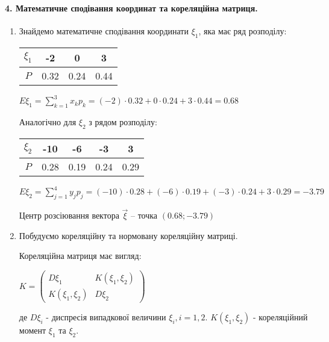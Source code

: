 \documentclass[a4paper, 20pt, titlepage]{article}
\begin{document}
\paragraph{4. Математичне сподівання координат та кореляційна матриця.}
\hfill \break

\begin{spacing}{1.4}
\begin{enumerate}
\item Знайдемо математичне сподівання координати $\xi_1$, яка має ряд розподілу:
\begin{center}
\begin{tabular}{|c|c|c|c|}
\hline
$\xi_1$ & -2 & 0 & 3 \\ \hline
$P$ & 0.32  & 0.24 &  0.44 \\ \hline
\end{tabular}

\vspace{5mm}
$E \xi_1 = \sum_{k = 1}^3 x_k p_k = (-2) \cdot 0.32 + 0 \cdot 0.24 + 3 \cdot 0.44 = 0.68$ 
\end{center}

\vspace{2mm}
Аналогічно для $\xi_2$ з рядом розподілу:

\begin{center}
\begin{tabular}{|c|c|c|c|c|}
\hline
$\xi_2$ & -10 & -6 & -3 & 3\\ \hline
$P$ & 0.28  & 0.19 &  0.24 & 0.29 \\ \hline
\end{tabular}

\vspace{5mm}
$E \xi_2 = \sum_{j = 1}^4 y_j p_j = (-10) \cdot 0.28 + (-6) \cdot 0.19 + (-3) \cdot 0.24 + 3 \cdot 0.29 = -3.79$
\end{center}

\vspace{2mm}

Центр розсіювання вектора $\vec{\xi}$ -- точка $(0.68 ; -3.79)$


\newpage{}

\item Побудуємо кореляційну та нормовану кореляційну матриці.

Кореляційна матриця має вигляд:
\begin{center}
$
K = 
\begin{pmatrix}
D \xi_1 & K(\xi_1,\xi_2) \\
K(\xi_1, \xi_2) & D\xi_2 
\end{pmatrix}
$
\end{center}
де $D \xi_i$ - диспресія випадкової величини $\xi_i, i =1,2. \,\,  K(\xi_1,\xi_2)$ - кореляційний момент $\xi_1$ та $\xi_2$.



\end{enumerate}
\end{spacing}
\end{document}
